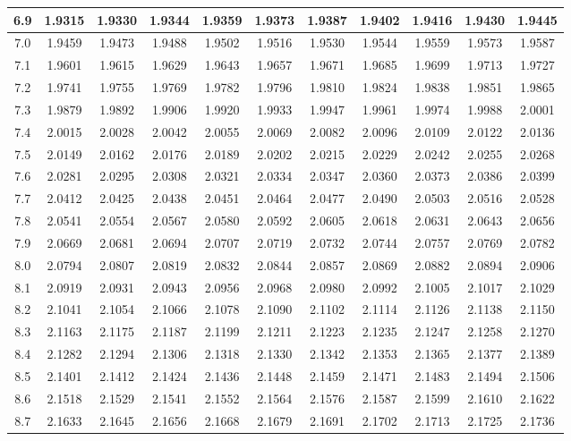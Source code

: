 {\begin{tabular}{|c|cccccccccc|}
6.9 & 1.9315 & 1.9330 & 1.9344 & 1.9359 & 1.9373 & 1.9387 & 1.9402 & 1.9416 & 1.9430 & 1.9445 \\
\hline
7.0 & 1.9459 & 1.9473 & 1.9488 & 1.9502 & 1.9516 & 1.9530 & 1.9544 & 1.9559 & 1.9573 & 1.9587 \\
7.1 & 1.9601 & 1.9615 & 1.9629 & 1.9643 & 1.9657 & 1.9671 & 1.9685 & 1.9699 & 1.9713 & 1.9727 \\
7.2 & 1.9741 & 1.9755 & 1.9769 & 1.9782 & 1.9796 & 1.9810 & 1.9824 & 1.9838 & 1.9851 & 1.9865 \\
7.3 & 1.9879 & 1.9892 & 1.9906 & 1.9920 & 1.9933 & 1.9947 & 1.9961 & 1.9974 & 1.9988 & 2.0001 \\
7.4 & 2.0015 & 2.0028 & 2.0042 & 2.0055 & 2.0069 & 2.0082 & 2.0096 & 2.0109 & 2.0122 & 2.0136 \\
\hline
7.5 & 2.0149 & 2.0162 & 2.0176 & 2.0189 & 2.0202 & 2.0215 & 2.0229 & 2.0242 & 2.0255 & 2.0268 \\
7.6 & 2.0281 & 2.0295 & 2.0308 & 2.0321 & 2.0334 & 2.0347 & 2.0360 & 2.0373 & 2.0386 & 2.0399 \\
7.7 & 2.0412 & 2.0425 & 2.0438 & 2.0451 & 2.0464 & 2.0477 & 2.0490 & 2.0503 & 2.0516 & 2.0528 \\
7.8 & 2.0541 & 2.0554 & 2.0567 & 2.0580 & 2.0592 & 2.0605 & 2.0618 & 2.0631 & 2.0643 & 2.0656 \\
7.9 & 2.0669 & 2.0681 & 2.0694 & 2.0707 & 2.0719 & 2.0732 & 2.0744 & 2.0757 & 2.0769 & 2.0782 \\
\hline
8.0 & 2.0794 & 2.0807 & 2.0819 & 2.0832 & 2.0844 & 2.0857 & 2.0869 & 2.0882 & 2.0894 & 2.0906 \\
8.1 & 2.0919 & 2.0931 & 2.0943 & 2.0956 & 2.0968 & 2.0980 & 2.0992 & 2.1005 & 2.1017 & 2.1029 \\
8.2 & 2.1041 & 2.1054 & 2.1066 & 2.1078 & 2.1090 & 2.1102 & 2.1114 & 2.1126 & 2.1138 & 2.1150 \\
8.3 & 2.1163 & 2.1175 & 2.1187 & 2.1199 & 2.1211 & 2.1223 & 2.1235 & 2.1247 & 2.1258 & 2.1270 \\
8.4 & 2.1282 & 2.1294 & 2.1306 & 2.1318 & 2.1330 & 2.1342 & 2.1353 & 2.1365 & 2.1377 & 2.1389 \\
\hline
8.5 & 2.1401 & 2.1412 & 2.1424 & 2.1436 & 2.1448 & 2.1459 & 2.1471 & 2.1483 & 2.1494 & 2.1506 \\
8.6 & 2.1518 & 2.1529 & 2.1541 & 2.1552 & 2.1564 & 2.1576 & 2.1587 & 2.1599 & 2.1610 & 2.1622 \\
8.7 & 2.1633 & 2.1645 & 2.1656 & 2.1668 & 2.1679 & 2.1691 & 2.1702 & 2.1713 & 2.1725 & 2.1736 \\

\end{tabular}}
